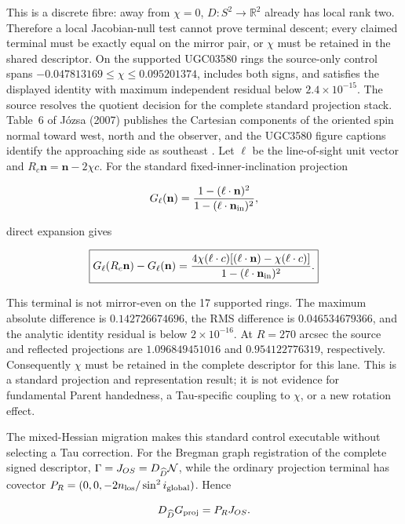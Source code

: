 \documentclass[11pt]{article}
\begin{document}
This is a discrete fibre: away from $\chi=0$, $D:S^2\to\mathbb R^2$
already has local rank two.  Therefore a local Jacobian-null test cannot prove
terminal descent; every claimed terminal must be exactly equal on the mirror
pair, or $\chi$ must be retained in the shared descriptor.  On the supported
UGC03580 rings the source-only control spans
$-0.047813169\leq\chi\leq0.095201374$, includes both signs, and satisfies the
displayed identity with maximum independent residual below $2.4\times10^{-15}$.
The source resolves the quotient decision for the complete standard projection
stack.  Table~6 of J{\'o}zsa (2007) publishes the Cartesian components of the
oriented spin normal toward west, north and the observer, and the UGC3580
figure captions identify the approaching side as southeast
\cite{Jozsa2007WarpedDisks}.  Let $\ell$ be the line-of-sight unit vector and
$R_c\mathbf n=\mathbf n-2\chi c$.  For the standard fixed-inner-inclination
projection

\[
G_\ell(\mathbf n)
=\frac{1-(\ell\mathbin{\cdot}\mathbf n)^2}
{1-(\ell\mathbin{\cdot}\mathbf n_{\rm in})^2},
\]

direct expansion gives

\[
\boxed{
G_\ell(R_c\mathbf n)-G_\ell(\mathbf n)
=\frac{4\chi(\ell\mathbin{\cdot}c)
[(\ell\mathbin{\cdot}\mathbf n)-\chi(\ell\mathbin{\cdot}c)]}
{1-(\ell\mathbin{\cdot}\mathbf n_{\rm in})^2}.}
\]

This terminal is not mirror-even on the 17 supported rings.  The maximum
absolute difference is $0.142726674696$, the RMS difference is
$0.046534679366$, and the analytic identity residual is below
$2\times10^{-16}$.  At $R=270$ arcsec the source and reflected projections
are $1.096849451016$ and $0.954122776319$, respectively.  Consequently
$\chi$ must be retained in the complete descriptor for this lane.  This is a
standard projection and representation result; it is not evidence for
fundamental Parent handedness, a Tau-specific coupling to $\chi$, or a new
rotation effect.

The mixed-Hessian migration makes this standard control executable without
selecting a Tau correction.  For the Bregman graph registration of the complete
signed descriptor, $\Gamma=J_{OS}=D_{\widehat D}{\cal N}$, while the ordinary
projection terminal has covector
$P_R=(0,0,-2n_{\rm los}/\sin^2 i_{\rm global})$.  Hence

\[
 D_{\widehat D}G_{\rm proj}=P_RJ_{OS}.
\]
\end{document}
